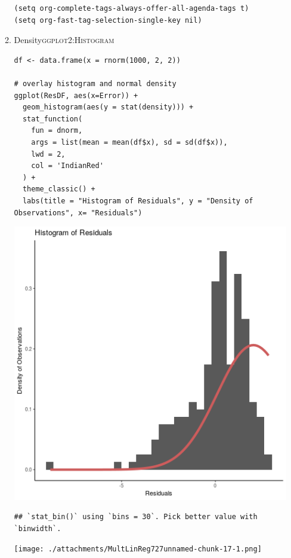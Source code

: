 \documentclass[11pt]{article}
\begin{document}
\begin{enumerate}
\begin{enumerate}
\begin{verbatim}
(setq org-complete-tags-always-offer-all-agenda-tags t)
(setq org-fast-tag-selection-single-key nil)
\end{verbatim}

\item Density\hfill{}\textsc{ggplot2:Histogram}
\label{sec:orge6d095e}
\begin{verbatim}
df <- data.frame(x = rnorm(1000, 2, 2))

# overlay histogram and normal density
ggplot(ResDF, aes(x=Error)) +
  geom_histogram(aes(y = stat(density))) +
  stat_function(
    fun = dnorm, 
    args = list(mean = mean(df$x), sd = sd(df$x)), 
    lwd = 2, 
    col = 'IndianRed'
  ) +
  theme_classic() +
  labs(title = "Histogram of Residuals", y = "Density of Observations", x= "Residuals")
\end{verbatim}

\begin{center}
\includegraphics[width=.9\linewidth]{HistOverlayMultLinReg.png}
\end{center}

\begin{verbatim}
## `stat_bin()` using `bins = 30`. Pick better value with `binwidth`.
\end{verbatim}

\begin{center}
\texttt{[image: ./attachments/MultLinReg727unnamed-chunk-17-1.png]}
\end{center}


\end{enumerate}
\end{enumerate}
\end{document}
